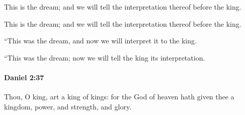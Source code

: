 			This is the dream; and we will tell the interpretation thereof before the king.

			\begin{versebox}
					\item[BHS] 
					\item[LXX] 
					\item[ASV] This is the dream; and we will tell the interpretation thereof before the king.
					\item[NIV] “This was the dream, and now we will interpret it to the king.
					\item[NRSV] “This was the dream; now we will tell the king its interpretation.
			\end{versebox}

		\paragraph{Daniel 2:37} %
			\label{DANIEL-2-37}

			Thou, O king, art a king of kings: for the God of heaven hath given thee a kingdom, power, and strength, and glory.

